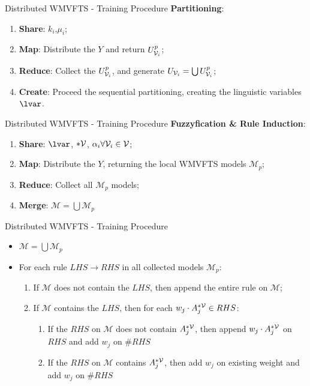 \documentclass{beamer}
\begin{document}
\begin{frame}{Distributed WMVFTS - Training Procedure}
\textbf{Partitioning}:
    \begin{enumerate}
        \item \textbf{Share}: $k_i$,$\mu_i$; 
        \item \textbf{Map}: Distribute the $Y$ and return $U_{\mathcal{V}_i}^p$;
        \item \textbf{Reduce}: Collect the $U_{\mathcal{V}_i}^p$, and generate $U_{\mathcal{V}_i} = \bigcup U_{\mathcal{V}_i}^p$;
        \item \textbf{Create}: Proceed the sequential partitioning, creating the linguistic variables $\lvar$. 
    \end{enumerate}
\end{frame}

\begin{frame}{Distributed WMVFTS - Training Procedure}
\textbf{Fuzzyfication \& Rule Induction}:
    \begin{enumerate}
        \item \textbf{Share}: $\lvar$, $*\mathcal{V}$, $\alpha_i \forall\mathcal{V}_i \in \mathcal{V}$;
        \item \textbf{Map}: Distribute the $Y$, returning the local WMVFTS models $\mathcal{M}_p$; 
        \item \textbf{Reduce}: Collect all $\mathcal{M}_p$ models; 
        \item \textbf{Merge}: $\mathcal{M} = \bigcup \mathcal{M}_p$
    \end{enumerate}
\end{frame}

\begin{frame}{Distributed WMVFTS - Training Procedure}
\begin{itemize}
    \item $\mathcal{M} = \bigcup \mathcal{M}_p$ 
    \item For each rule $LHS \rightarrow RHS$ in all collected models $\mathcal{M}_p$:
        \begin{enumerate}
            \item If $\mathcal{M}$ does not contain the $LHS$, then append the entire rule on $\mathcal{M}$;
            \item If $\mathcal{M}$ contains the $LHS$, then for each $w_j \cdot A_j^{*\mathcal{V}} \in RHS$:
            \begin{enumerate}
            \item If the $RHS$ on $\mathcal{M}$ does not contain $A_j^{*\mathcal{V}}$, then append $w_j \cdot A_j^{*\mathcal{V}}$ on $RHS$ and add $w_j$ on $\#RHS$
            \item If the $RHS$ on $\mathcal{M}$ contains $A_j^{*\mathcal{V}}$, then add $w_j$ on existing weight and add $w_j$ on $\#RHS$
            \end{enumerate}
            \end{enumerate}
\end{itemize}
\end{frame}
\end{document}

